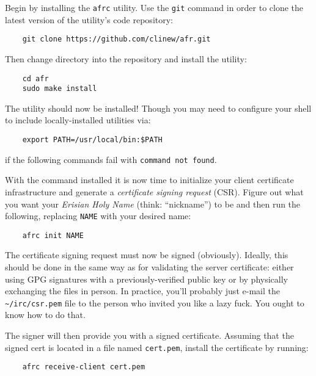 \documentclass{article}
\begin{document}
{Begin by installing the \texttt{afrc} utility.  Use the \texttt{git} command in order to clone the latest version of the utility's code repository:
\begin{lstlisting}
    git clone https://github.com/clinew/afr.git
\end{lstlisting}
Then change directory into the repository and install the utility:
\begin{lstlisting}
    cd afr
    sudo make install
\end{lstlisting}
The utility should now be installed!  Though you may need to configure your shell to include locally-installed utilities via:
\begin{lstlisting}
    export PATH=/usr/local/bin:$PATH
\end{lstlisting}
if the following commands fail with \texttt{command not found}.

With the command installed it is now time to initialize your client certificate infrastructure and generate a \emph{certificate signing request} (CSR).  Figure out what you want your \emph{Erisian Holy Name} (think: ``nickname'') to be and then run the following, replacing \texttt{NAME} with your desired name:
\begin{lstlisting}
    afrc init NAME
\end{lstlisting}
The certificate signing request must now be signed (obviously).  Ideally, this should be done in the same way as for validating the server certificate: either using GPG signatures with a previously-verified public key or by physically exchanging the files in person.  In practice, you'll probably just e-mail the \texttt{\textasciitilde/irc/csr.pem} file to the person who invited you like a lazy fuck.  You ought to know how to do that.

The signer will then provide you with a signed certificate.  Assuming that the signed cert is located in a file named \texttt{cert.pem}, install the certificate by running:
\begin{lstlisting}
    afrc receive-client cert.pem
\end{lstlisting}

}
\end{document}
